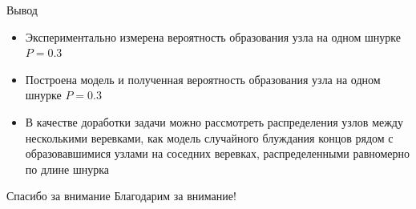 \begin{frame}{Вывод}
	\begin{itemize}
		\item Экспериментально измерена вероятность образования узла на одном шнурке $P=0.3$
		\item Построена модель и полученная вероятность образования узла на одном шнурке $P=0.3$
		\item В качестве доработки задачи можно рассмотреть распределения узлов между несколькими веревками, как модель случайного блуждания концов рядом с образовавшимися узлами на соседних веревках, распределенными равномерно по длине шнурка
	\end{itemize}
\end{frame}

\begin{frame}{Спасибо за внимание}
	Благодарим за внимание!
\end{frame}

%

%
%
%
%

